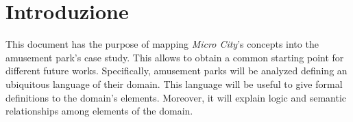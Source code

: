 \section*{Introduzione}
\label{sec:introduction}

This document has the purpose of mapping \textit{Micro City}'s concepts into the amusement park's case study. This allows to obtain a common starting point for different future works. Specifically, amusement parks will be analyzed defining an ubiquitous language of their domain. This language will be useful to give formal definitions to the domain's elements. Moreover, it will explain logic and semantic relationships among elements of the domain.

